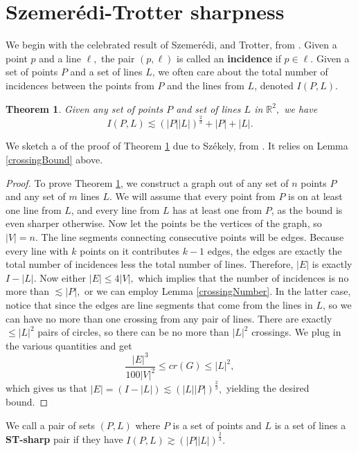 \documentclass[12pt]{article}
\newtheorem{theorem}{Theorem}[section]
\begin{document}
\section{Szemer\'edi-Trotter sharpness}
We begin with the celebrated result of Szemer\'edi, and Trotter, from \cite{ST83}. Given a point $p$ and a line $\ell,$ the pair $(p,\ell)$ is called an {\bf incidence} if $p\in\ell.$ Given a set of points $P$ and a set of lines $L$, we often care about the total number of incidences between the points from $P$ and the lines from $L$, denoted $I(P,L).$
\begin{theorem}\label{ST}
Given any set of points $P$ and set of lines $L$ in $\mathbb R^2,$ we have
$$I(P,L) \lesssim (|P||L|)^\frac{2}{3}+|P|+|L|.$$
\end{theorem}
We sketch a of the proof of Theorem \ref{ST} due to Sz\' ekely, from \cite{Szek}. It relies on Lemma \ref{crossingBound} above.
\begin{proof}
To prove Theorem \ref{ST}, we construct a graph out of any set of $n$ points $P$ and any set of $m$ lines $L$. We will assume that every point from $P$ is on at least one line from $L$, and every line from $L$ has at least one from $P$, as the bound is even sharper otherwise. Now let the points be the vertices of the graph, so $|V|=n.$ The line segments connecting consecutive points will be edges. Because every line with $k$ points on it contributes $k-1$ edges, the edges are exactly the total number of incidences less the total number of lines. Therefore, $|E|$ is exactly $I-|L|$. Now either $|E|\leq 4|V|,$ which implies that the number of incidences is no more than $\lesssim|P|,$ or we can employ Lemma \ref{crossingNumber}. In the latter case, notice that since the edges are line segments that come from the lines in $L$, so we can have no more than one crossing from any pair of lines. There are exactly $\leq|L|^2$ pairs of circles, so there can be no more than $|L|^2$ crossings. We plug in the various quantities and get
\begin{equation}\label{crossingBound}
\frac{|E|^3}{100|V|^2}\leq cr(G)\leq |L|^2,
\end{equation}
which gives us that $|E|=(I-|L|)\lesssim (|L||P|)^\frac{2}{3},$
yielding the desired bound.
\end{proof}
We call a pair of sets $(P,L)$ where $P$ is a set of points and $L$ is a set of lines a {\bf ST-sharp} pair if they have $I(P,L)\gtrsim (|P||L|)^\frac{2}{3}.$
\end{document}
